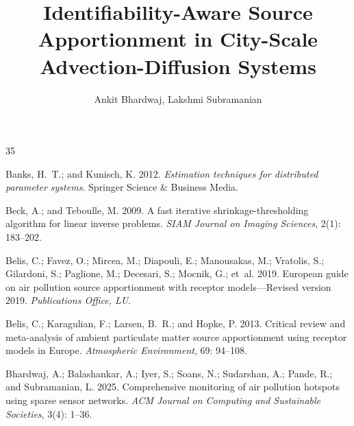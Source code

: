 \documentclass[letterpaper]{article} %
\title{Identifiability-Aware Source Apportionment in City-Scale Advection-Diffusion Systems}
\author{
    Ankit Bhardwaj,
    Lakshmi Subramanian
}
\theoremstyle{plain}
\theoremstyle{definition}
\theoremstyle{remark}
\begin{document}
\maketitle











\begin{thebibliography}{35}
\providecommand{\natexlab}[1]{#1}

Banks, H.~T.; and Kunisch, K. 2012.
\newblock \emph{Estimation techniques for distributed parameter systems}.
\newblock Springer Science \& Business Media.

Beck, A.; and Teboulle, M. 2009.
\newblock A fast iterative shrinkage-thresholding algorithm for linear inverse
  problems.
\newblock \emph{SIAM Journal on Imaging Sciences}, 2(1): 183--202.

Belis, C.; Favez, O.; Mircea, M.; Diapouli, E.; Manousakas, M.; Vratolis, S.;
  Gilardoni, S.; Paglione, M.; Decesari, S.; Mocnik, G.; et~al. 2019.
\newblock European guide on air pollution source apportionment with receptor
  models—Revised version 2019.
\newblock \emph{Publications Office, LU}.

Belis, C.; Karagulian, F.; Larsen, B.~R.; and Hopke, P. 2013.
\newblock Critical review and meta-analysis of ambient particulate matter
  source apportionment using receptor models in Europe.
\newblock \emph{Atmospheric Environment}, 69: 94--108.

Bhardwaj, A.; Balashankar, A.; Iyer, S.; Soans, N.; Sudarshan, A.; Pande, R.;
  and Subramanian, L. 2025.
\newblock Comprehensive monitoring of air pollution hotspots using sparse
  sensor networks.
\newblock \emph{ACM Journal on Computing and Sustainable Societies}, 3(4):
  1--36.


\end{thebibliography}
\end{document}
